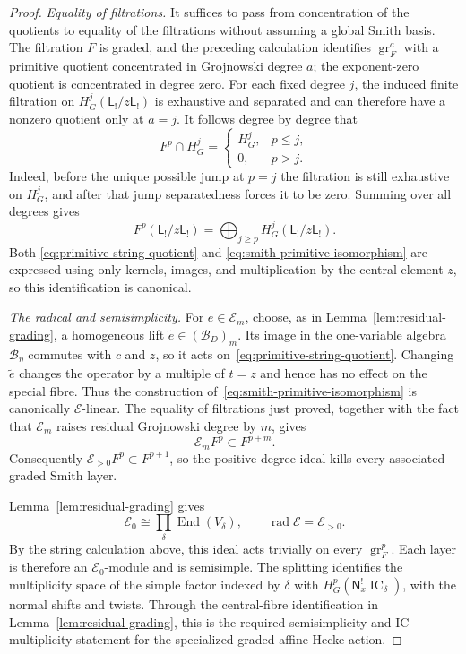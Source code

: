\documentclass[10pt,a4paper]{amsart}
\newcommand{\IC}{\operatorname{IC}}
\begin{document}
\begin{proof}
\smallskip
\noindent\emph{Equality of filtrations.}
It suffices to pass from concentration of the quotients to equality of the
filtrations without assuming a global Smith basis.  The filtration $F$ is
graded, and the preceding calculation identifies
$\operatorname{gr}_F^a$ with a primitive quotient concentrated in
Grojnowski degree $a$; the exponent-zero quotient is concentrated in degree
zero.  For each fixed degree $j$, the induced finite filtration on
$H_G^j(\mathsf L_!/z\mathsf L_!)$ is exhaustive and separated and can
therefore have a nonzero quotient only at $a=j$.  It follows degree by
degree that
\[
 F^p\cap H_G^j=
 \begin{cases}
  H_G^j,&p\leq j,\\
  0,&p>j.
 \end{cases}
\]
Indeed, before the unique possible jump at $p=j$ the filtration is still
exhaustive on $H_G^j$, and after that jump separatedness forces it to be
zero.  Summing over all degrees gives
\[
 F^p(\mathsf L_!/z\mathsf L_!)=
 \bigoplus_{j\geq p}H_G^j(\mathsf L_!/z\mathsf L_!).
\]
Both
\eqref{eq:primitive-string-quotient} and
\eqref{eq:smith-primitive-isomorphism} are expressed using only kernels,
images, and multiplication by the central element $z$, so this identification
is canonical.

\smallskip
\noindent\emph{The radical and semisimplicity.}
For $e\in\mathcal E_m$, choose, as in
Lemma~\ref{lem:residual-grading}, a homogeneous lift
$\widetilde e\in(\mathcal B_D)_m$.  Its image in the one-variable algebra
$\mathcal B_\eta$ commutes with $c$ and $z$, so it acts
on~\eqref{eq:primitive-string-quotient}.  Changing $\widetilde e$ changes
the operator by a multiple of $t=z$ and hence has no effect on the special
fibre.  Thus the construction of~\eqref{eq:smith-primitive-isomorphism} is
canonically $\mathcal E$-linear.  The equality of filtrations just proved,
together with the fact that $\mathcal E_m$ raises residual Grojnowski degree
by $m$, gives
\[
 \mathcal E_mF^p\subset F^{p+m}.
\]
Consequently $\mathcal E_{>0}F^p\subset F^{p+1}$, so the positive-degree
ideal kills every associated-graded Smith layer.

Lemma~\ref{lem:residual-grading} gives
\[
 \mathcal E_0\cong\prod_\delta\operatorname{End}(V_\delta),
 \qquad \operatorname{rad}\mathcal E=\mathcal E_{>0}.
\]
By the string calculation above, this ideal acts trivially on every
$\operatorname{gr}^p_F$.  Each layer is therefore an
$\mathcal E_0$-module and is semisimple.  The splitting identifies the
multiplicity space of the simple factor indexed by $\delta$ with
$H_G^p(\mathsf N_x^!\IC_\delta)$, with the normal shifts and twists.
Through the central-fibre identification in
Lemma~\ref{lem:residual-grading}, this is the required
semisimplicity and IC multiplicity statement for the specialized graded
affine Hecke action.
\end{proof}
\end{document}
